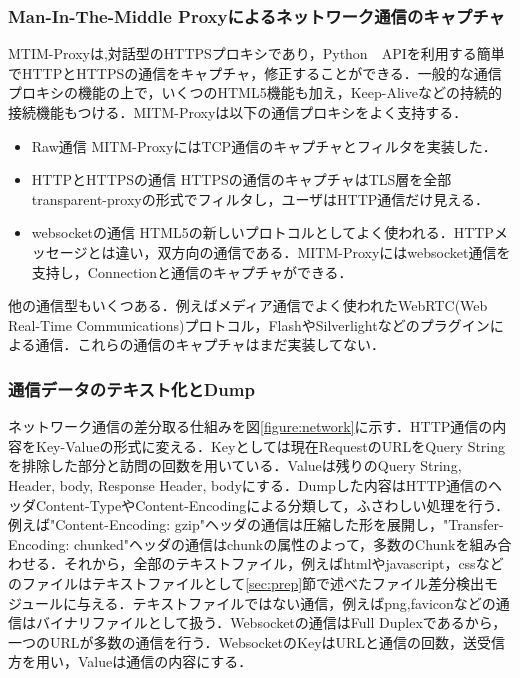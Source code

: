 \documentclass[submit,techrep]{ipsj}
\begin{document}
\begin{itemize}
\subsubsection{Man-In-The-Middle Proxyによるネットワーク通信のキャプチャ}

MTIM-Proxyは,対話型のHTTPSプロキシであり，Python　APIを利用する簡単でHTTPとHTTPSの通信をキャプチャ，修正することができる．一般的な通信プロキシの機能の上で，いくつのHTML5機能も加え，Keep-Aliveなどの持続的接続機能もつける．MITM-Proxyは以下の通信プロキシをよく支持する．
\begin{itemize}
\item
Raw通信
MITM-ProxyにはTCP通信のキャプチャとフィルタを実装した．
\item
HTTPとHTTPSの通信
HTTPSの通信のキャプチャはTLS層を全部transparent-proxyの形式でフィルタし，ユーザはHTTP通信だけ見える．
\item
websocketの通信
HTML5の新しいプロトコルとしてよく使われる．HTTPメッセージとは違い，双方向の通信である．MITM-Proxyにはwebsocket通信を支持し，Connectionと通信のキャプチャができる．

\end{itemize}

他の通信型もいくつある．例えばメディア通信でよく使われたWebRTC(Web Real-Time Communications)プロトコル，FlashやSilverlightなどのプラグインによる通信．これらの通信のキャプチャはまだ実装してない．

\subsubsection{通信データのテキスト化とDump}

ネットワーク通信の差分取る仕組みを図\ref{figure:network}に示す．HTTP通信の内容をKey-Valueの形式に変える．Keyとしては現在RequestのURLをQuery Stringを排除した部分と訪問の回数を用いている．Valueは残りのQuery String, Header, body, Response Header, bodyにする．Dumpした内容はHTTP通信のヘッダContent-TypeやContent-Encodingによる分類して，ふさわしい処理を行う．例えば"Content-Encoding: gzip"ヘッダの通信は圧縮した形を展開し，"Transfer-Encoding: chunked"ヘッダの通信はchunkの属性のよって，多数のChunkを組み合わせる．それから，全部のテキストファイル，例えばhtmlやjavascript，cssなどのファイルはテキストファイルとして\ref{sec:prep}節で述べたファイル差分検出モジュールに与える．テキストファイルではない通信，例えばpng,faviconなどの通信はバイナリファイルとして扱う．Websocketの通信はFull Duplexであるから，一つのURLが多数の通信を行う．WebsocketのKeyはURLと通信の回数，送受信方を用い，Valueは通信の内容にする．


\end{itemize}
\end{document}
